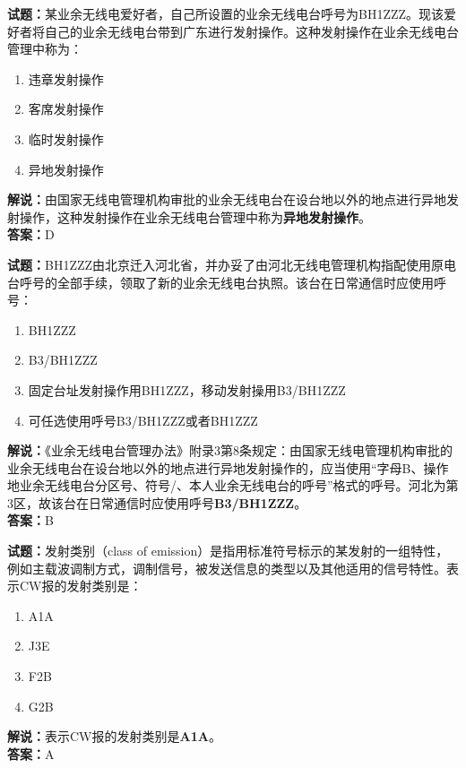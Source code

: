 \documentclass{ctexbook}
\begin{document}
\bigskip


\noindent\textbf{试题：}某业余无线电爱好者，自己所设置的业余无线电台呼号为BH1ZZZ。现该爱好者将自己的业余无线电台带到广东进行发射操作。这种发射操作在业余无线电台管理中称为：
\begin{enumerate}[leftmargin=3em]
\item 违章发射操作
\item 客席发射操作
\item 临时发射操作
\item 异地发射操作
\end{enumerate}
\noindent\textbf{解说：}由国家无线电管理机构审批的业余无线电台在设台地以外的地点进行异地发射操作，这种发射操作在业余无线电台管理中称为\textbf{异地发射操作}。\\\noindent\textbf{答案：}D





\bigskip


\noindent\textbf{试题：}BH1ZZZ由北京迁入河北省，并办妥了由河北无线电管理机构指配使用原电台呼号的全部手续，领取了新的业余无线电台执照。该台在日常通信时应使用呼号：
\begin{enumerate}[leftmargin=3em]
\item BH1ZZZ
\item B3/BH1ZZZ
\item 固定台址发射操作用BH1ZZZ，移动发射操用B3/BH1ZZZ
\item 可任选使用呼号B3/BH1ZZZ或者BH1ZZZ
\end{enumerate}
\noindent\textbf{解说：}《业余无线电台管理办法》附录3第8条规定：由国家无线电管理机构审批的业余无线电台在设台地以外的地点进行异地发射操作的，应当使用“字母B、操作地业余无线电台分区号、符号/、本人业余无线电台的呼号”格式的呼号。河北为第3区，故该台在日常通信时应使用呼号\textbf{B3/BH1ZZZ}。\\\noindent\textbf{答案：}B




\bigskip


\noindent\textbf{试题：}发射类别（class of emission）是指用标准符号标示的某发射的一组特性，例如主载波调制方式，调制信号，被发送信息的类型以及其他适用的信号特性。表示CW报的发射类别是：
\begin{enumerate}[leftmargin=3em]
\item A1A
\item J3E
\item F2B
\item G2B
\end{enumerate}
\noindent\textbf{解说：}表示CW报的发射类别是\textbf{A1A}。\\\noindent\textbf{答案：}A
\end{document}
